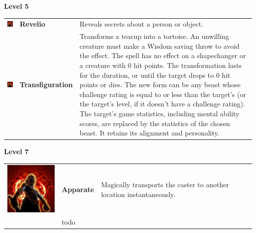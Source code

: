 \textbf{Level 5} 
\begin{tabular}{ m{4cm}m{3cm}m{6cm} } 
	\includegraphics[width=4cm]{../Pictures/Gameplay/Spells/Icon/spell_icon.png} & \textbf{Revelio} & Reveals secrets about a person or object.  \\ %
	\includegraphics[width=4cm]{../Pictures/Gameplay/Spells/Icon/spell_icon.png} & \textbf{Transfiguration} & Transforms a teacup into a tortoise.  An unwilling creature must make a Wisdom saving throw to avoid the effect. The spell has no effect on a shapechanger or a creature with 0 hit points. The transformation lasts for the duration, or until the target drops to 0 hit points or dies. The new form can be any beast whose challenge rating is equal to or less than the target's (or the target's level, if it doesn't have a challenge rating). The target's game statistics, including mental ability scores, are replaced by the statistics of the chosen beast. It retains its alignment and personality.\\ 
\end{tabular}
\textbf{Level 7} 
\begin{tabular}{ m{4cm}m{3cm}m{6cm} } 
	\includegraphics[width=4cm]{../Pictures/Gameplay/Spells/Icon/spell_icon.png} & \textbf{Apparate} & Magically transports the caster to another location instantaneously.  \\ &todo
\end{tabular}
